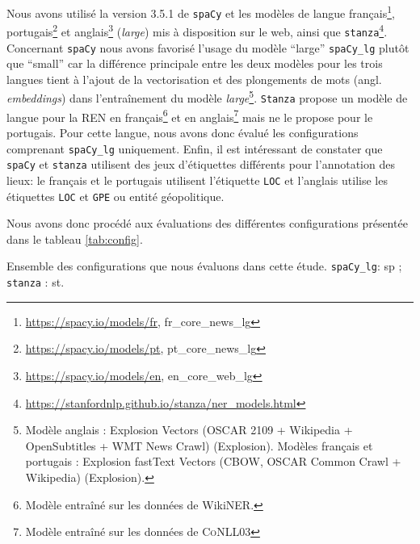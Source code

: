 Nous avons utilisé la version 3.5.1 de \texttt{spaCy} et les modèles de langue français\footnote{\url{https://spacy.io/models/fr}, fr\_core\_news\_lg}, portugais\footnote{\url{https://spacy.io/models/pt}, pt\_core\_news\_lg} et anglais\footnote{\url{https://spacy.io/models/en}, en\_core\_web\_lg} (\textit{large}) mis à disposition sur le web, ainsi que \texttt{stanza}\footnote{\url{https://stanfordnlp.github.io/stanza/ner_models.html}}. 
Concernant  \texttt{spaCy} nous avons favorisé l'usage du modèle ``large''  \texttt{spaCy\_lg} plutôt que ``small'' car la différence principale entre les deux modèles pour les trois langues tient à l'ajout de la vectorisation et des plongements de mots (angl. \textit{embeddings}) dans l'entraînement du modèle \textit{large}\footnote{Modèle anglais : Explosion Vectors (OSCAR 2109 + Wikipedia + OpenSubtitles + WMT News Crawl) (Explosion). Modèles français et portugais :
Explosion fastText Vectors (CBOW, OSCAR Common Crawl + Wikipedia) (Explosion).}.
\texttt{Stanza} propose un modèle de langue pour la REN en français\footnote{Modèle entraîné sur les données de WikiNER.} et en anglais\footnote{Modèle entraîné sur les données de \textsc{CoNLL03}} mais ne le propose pour le portugais. Pour cette langue, nous avons donc évalué les configurations comprenant \texttt{spaCy\_lg} uniquement.
Enfin, il est intéressant de constater que \texttt{spaCy} et \texttt{stanza} utilisent des jeux d'étiquettes différents pour l'annotation des lieux: le français et le portugais utilisent l'étiquette \texttt{LOC} et l'anglais utilise les étiquettes \texttt{LOC} et \texttt{GPE} ou \og{}entité géopolitique\fg{}. 

Nous avons donc procédé aux évaluations des différentes configurations présentée dans le tableau \ref{tab:config}.

\begin{table}[h!]
    \centering
   
    \caption{Ensemble des configurations que nous évaluons dans cette étude. \texttt{spaCy\_lg}: sp ; \texttt{stanza} : st.}
    \label{tab:config}
\end{table}




